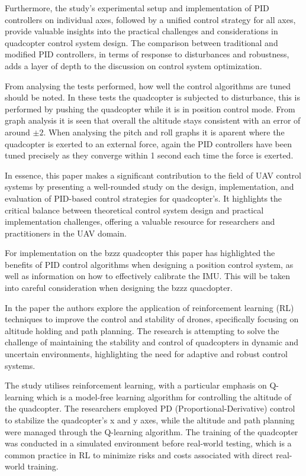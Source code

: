 \documentclass{report}
\begin{document}
Furthermore, the study's experimental setup and implementation of PID
controllers on individual axes, followed by a unified control strategy for all
axes, provide valuable insights into the practical challenges and considerations
in quadcopter control system design. The comparison between traditional and
modified PID controllers, in terms of response to disturbances and robustness,
adds a layer of depth to the discussion on control system optimization.

From analysing the tests performed, how well the control algorithms are tuned
should be noted. In these tests the quadcopter is subjected to disturbance, this
is performed by pushing the quadcopter while it is in position control mode.
From graph analysis it is seen that overall the altitude stays consistent with
an error of around \(\pm2\). When analysing the pitch and roll graphs it is
aparent where the quadcopter is exerted to an external force, again the PID
controllers have been tuned precisely as they converge within 1 second each time
the force is exerted. 

In essence, this paper makes a significant contribution to the field of UAV
control systems by presenting a well-rounded study on the design,
implementation, and evaluation of PID-based control strategies for quadcopter's.
It highlights the critical balance between theoretical control system design and
practical implementation challenges, offering a valuable resource for
researchers and practitioners in the UAV domain.

For implementation on the bzzz quadcopter this paper has highlighted the
benefits of PID control algorithms when designing a position control system, as
well as information on how to effectively calibrate the IMU. This will be taken
into careful consideration when designing the bzzz quacdopter.

In the paper \cite{ReinforcementLearning} the authors  explore the application of reinforcement
learning (RL) techniques to improve the control and stability of drones,
specifically focusing on altitude holding and path planning. The research is
attempting to solve the challenge of maintaining the stability and control of
quadcopters in dynamic and uncertain environments, highlighting the need for
adaptive and robust control systems.

The study utilises reinforcement learning, with a particular emphasis on
Q-learning which is a model-free learning algorithm for controlling the altitude
of the quadcopter. The researchers employed PD (Proportional-Derivative) control
to stabilize the quadcopter's x and y axes, while the altitude and path planning
were managed through the Q-learning algorithm. The training of the quadcopter
was conducted in a simulated environment before real-world testing, which is a
common practice in RL to minimize risks and costs associated with direct
real-world training.
\end{document}
